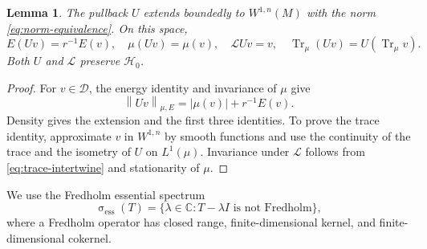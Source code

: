 \documentclass[11pt,reqno]{amsart}
\theoremstyle{plain}
\newtheorem{lemma}[theorem]{Lemma}
\theoremstyle{definition}
\theoremstyle{remark}
\newcommand{\C}{\mathbb C}
\newcommand{\Lop}{\mathcal L}
\newcommand{\Hcal}{\mathcal H}
\newcommand{\Dcal}{\mathcal D}
\newcommand{\Tr}{\operatorname{Tr}_{\mu}}
\newcommand{\norm}[1]{\left\lVert #1\right\rVert}
\DeclareMathOperator{\spec}{\sigma}
\numberwithin{equation}{section}
\begin{document}
\begin{lemma}\label{lem:U-extension}
The pullback $U$ extends boundedly to $W^{1,n}(M)$ with the norm \eqref{eq:norm-equivalence}. On this space,
\begin{equation}\label{eq:U-extension}
 E(Uv)=r^{-1}E(v),\quad \mu(Uv)=\mu(v),\quad
 \Lop Uv=v,\quad \Tr(Uv)=U(\Tr v).
\end{equation}
Both $U$ and $\Lop$ preserve $\Hcal_0$.
\end{lemma}

\begin{proof}
For $v\in\Dcal$, the energy identity and invariance of $\mu$ give
\[
 \norm{Uv}_{\mu,E}=|\mu(v)|+r^{-1}E(v).
\]
Density gives the extension and the first three identities. To prove the trace identity, approximate $v$ in $W^{1,n}$ by smooth functions and use the continuity of the trace and the isometry of $U$ on $L^1(\mu)$. Invariance under $\Lop$ follows from \eqref{eq:trace-intertwine} and stationarity of $\mu$.
\end{proof}

We use the Fredholm essential spectrum
\[
 \spec_{\mathrm{ess}}(T)=\{\lambda\in\C:T-\lambda I\text{ is not Fredholm}\},
\]
where a Fredholm operator has closed range, finite-dimensional kernel, and finite-dimensional cokernel.
\end{document}
